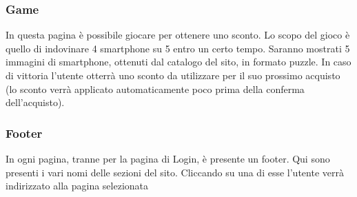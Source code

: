 \documentclass[14pt]{extarticle}
\begin{document}
\subsubsection{Game}
In questa pagina è possibile giocare per ottenere uno sconto. Lo scopo del gioco è quello di
indovinare 4 smartphone su 5 entro un certo tempo. Saranno mostrati 5 immagini di smartphone,
ottenuti dal catalogo del sito, in formato puzzle. In caso di vittoria l'utente otterrà uno sconto da 
utilizzare per il suo prossimo acquisto (lo sconto verrà applicato automaticamente poco prima
della conferma dell'acquisto).


\subsubsection{Footer}
In ogni pagina, tranne per la pagina di Login, è presente un footer. Qui sono presenti i vari nomi
delle sezioni del sito. Cliccando su una di esse l'utente verrà indirizzato alla pagina selezionata
\end{document}
